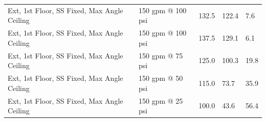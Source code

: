 \documentclass{article}
\begin{document}
\begin{table}[]
\begin{tabular}{lllll}
Ext, 1st Floor, SS Fixed, Max Angle Ceiling           & 150 gpm @ 100 psi                   & 132.5                                  & 122.4                                   & 7.6                                     \\
Ext, 1st Floor, SS Fixed, Max Angle Ceiling           & 150 gpm @ 100 psi                   & 137.5                                  & 129.1                                   & 6.1                                     \\
Ext, 1st Floor, SS Fixed, Max Angle Ceiling           & 150 gpm @ 75 psi                    & 125.0                                  & 100.3                                   & 19.8                                    \\
Ext, 1st Floor, SS Fixed, Max Angle Ceiling           & 150 gpm @ 50 psi                    & 115.0                                  & 73.7                                    & 35.9                                    \\
Ext, 1st Floor, SS Fixed, Max Angle Ceiling           & 150 gpm @ 25 psi                    & 100.0                                  & 43.6                                    & 56.4                                   
\end{tabular}
\end{table}


\end{document}
